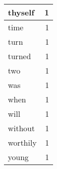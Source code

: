\begin{center}
\begin{longtable}{l|r}
thyself & 1 \\ \hline
time & 1 \\ \hline
turn & 1 \\ \hline
turned & 1 \\ \hline
two & 1 \\ \hline
was & 1 \\ \hline
when & 1 \\ \hline
will & 1 \\ \hline
without & 1 \\ \hline
worthily & 1 \\ \hline
young & 1 \\ \hline
\end{longtable}
\end{center}



\normalsize



 
